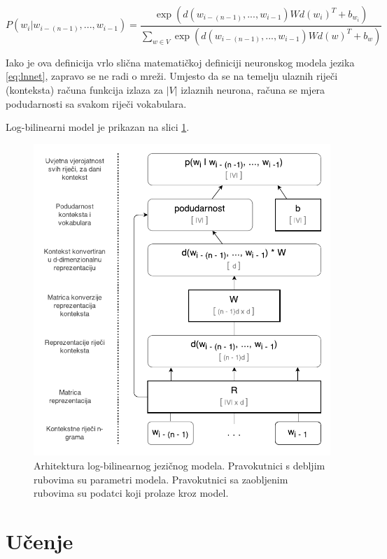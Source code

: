 \documentclass[times, utf8, diplomski, numeric]{fer}
\begin{document}
\begin{equation}
P(w_i | w_{i - (n - 1)}, ... , w_{i - 1}) 
  = \frac{\exp(d(w_{i - (n - 1)}, ... , w_{i - 1}) W d(w_i)^T + b_{w_i})}
  {\sum_{w \in V} \exp(d(w_{i - (n - 1)}, ... , w_{i - 1}) W d(w)^T + b_{w})}
\end{equation}

Iako je ova definicija vrlo slična matematičkoj definiciji neuronskog modela jezika \ref{eq:lnnet}, zapravo se ne radi o mreži. Umjesto da se na temelju ulaznih riječi (konteksta) računa funkcija izlaza za $|V|$ izlaznih neurona, računa se mjera podudarnosti sa svakom riječi vokabulara.

Log-bilinearni model je prikazan na slici \ref{fig:lbl}.

\begin{figure}[!htb]
\centering
\includegraphics{fig/lbl.pdf}
\caption{Arhitektura log-bilinearnog jezičnog modela. Pravokutnici s debljim rubovima su parametri modela. Pravokutnici sa zaobljenim rubovima su podatci koji prolaze kroz model.}
\label{fig:lbl}
\end{figure}

\section{Učenje}
\end{document}
